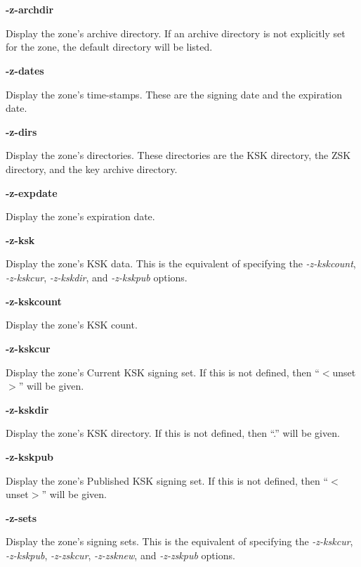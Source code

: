 \begin{description}

\item {\bf -z-archdir}\verb" "

Display the zone's archive directory.  If an archive directory is not
explicitly set for the zone, the default directory will be listed.

\item {\bf -z-dates}\verb" "

Display the zone's time-stamps.  These are the signing date and the
expiration date.

\item {\bf -z-dirs}\verb" "

Display the zone's directories.  These directories are the KSK directory,
the ZSK directory, and the key archive directory.

\item {\bf -z-expdate}\verb" "

Display the zone's expiration date.

\item {\bf -z-ksk}\verb" "

Display the zone's KSK data.  This is the equivalent of specifying the {\it
-z-kskcount}, {\it -z-kskcur}, {\it -z-kskdir}, and {\it -z-kskpub} options.

\item {\bf -z-kskcount}\verb" "

Display the zone's KSK count.

\item {\bf -z-kskcur}\verb" "

Display the zone's Current KSK signing set.
If this is not defined, then ``$<$unset$>$'' will be given.

\item {\bf -z-kskdir}\verb" "

Display the zone's KSK directory.
If this is not defined, then ``.'' will be given.

\item {\bf -z-kskpub}\verb" "

Display the zone's Published KSK signing set.
If this is not defined, then ``$<$unset$>$'' will be given.

\item {\bf -z-sets}\verb" "

Display the zone's signing sets.  This is the equivalent of specifying the
{\it -z-kskcur}, {\it -z-kskpub}, {\it -z-zskcur}, {\it -z-zsknew}, and {\it
-z-zskpub} options.


\end{description}
